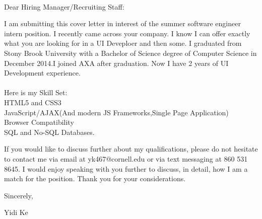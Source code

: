 \documentclass{letter}
\begin{document}
\begin{letter}
{\\
}


\opening{Dear Hiring Manager/Recruiting Staff:}

I am submitting this cover letter in interest of the summer software engineer intern position. I recently came across your company. I know I can offer exactly what you are looking for in a UI Deveploer and then some. I graduated from Stony Brook University with a Bachelor of Science degree of Computer Science in December 2014.I joined AXA after graduation. Now I have 2 years of UI Development experience.\\
\\
Here is my Skill Set:\\
HTML5 and CSS3\\ JavaScript/AJAX(And modern JS Frameworks,Single Page Application)\\
 Browser Compatibility\\
%
%
 SQL and No-SQL Databases.



If you would like to discuss further about my qualifications, please do
not hesitate to contact me via email at yk467@cornell.edu or via text messaging at 860 531 8645. I would enjoy speaking with you further to discuss, in detail, how I am a match for the position. Thank you for your considerations.


\closing{Sincerely,
}


Yidi Ke\\

\end{letter}
\end{document}
